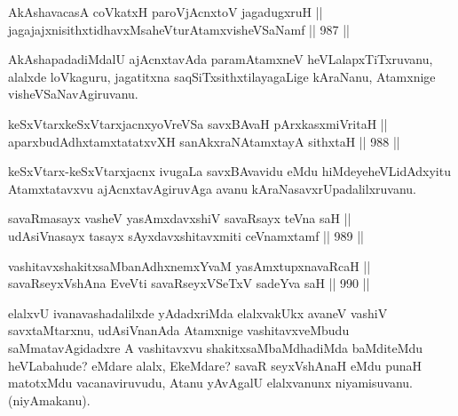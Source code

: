 
\begin{shl}
AkAshavacasA coVkatxH paroV\s jAcnxtoV jagadugxruH || \\
jagajajxnisithxtidhavxMsaheVturAtamxvisheVSaNamf \hfill || 987 ||  
\end{shl}

\begin{artha}
AkAshapadadiMdalU ajAcnxtavAda paramAtamxneV heVLalapxTiTxruvanu, alalxde loVkaguru, jagatitxna saqSiTxsithxtilayagaLige kAraNanu, Atamxnige visheVSaNavAgiruvanu.
\end{artha}

\begin{shl}
keSxVtarxkeSxVtarxjacnxyoVreVSa savxBAvaH pArxkasxmiVritaH || \\
aparxbudAdhxtamxtatatxvXH sanAkxraNAtamxtayA sithxtaH \hfill || 988 ||  
\end{shl}

\begin{artha}
keSxVtarx-keSxVtarxjacnx ivugaLa savxBAvavidu eMdu hiMdeye\break heVLidAdxyitu Atamxtatavxvu ajAcnxtavAgiruvAga avanu kAraNa\-\break savxrUpadalilxruvanu.
\end{artha}


\begin{shl}
savaRmasayx vasheV yasAmxdavxshiV savaRsayx teVna saH || \\
udAsiVnasayx tasayx sAyxdavxshitavxmiti ceVnamxtamf \hfill || 989 ||  
\end{shl}

\begin{shl}
vashitavxshakitxsaMbanAdhxnemxYvaM yasAmxtupxnavaRcaH || \\
savaRseyxVshAna EveVti savaRseyxVSeTxV sadeYva saH \hfill || 990 ||  
\end{shl}

\begin{artha}
elalxvU ivanavashadalilxde yAdadxriMda elalxvakUkx avaneV vashiV savxtaMtarxnu, udAsiVnanAda Atamxnige vashitavxveMbudu saMmatavAgidadxre A vashitavxvu shakitxsaMbaMdhadiMda baMditeMdu heVLabahude? eMdare alalx, EkeMdare? savaR seyxVshAnaH eMdu punaH matotxMdu vacanaviruvudu, Atanu yAvAgalU elalxvanunx niyamisuvanu.\break (niyAmakanu).
\end{artha}


